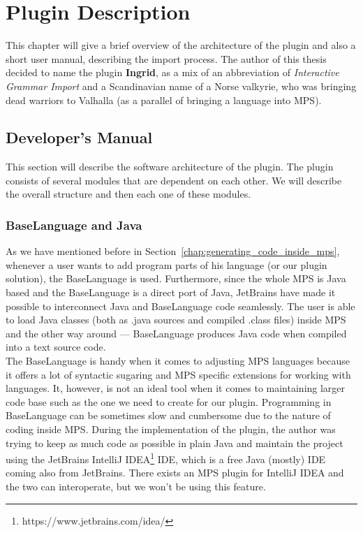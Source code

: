 \chapter{Plugin Description}

This chapter will give a brief overview of the architecture of the plugin and also a short user manual, describing the import process.
The author of this thesis decided to name the plugin \textbf{Ingrid}, as a mix of an abbreviation of \textit{Interactive Grammar Import} and a Scandinavian name of a Norse valkyrie, who was bringing dead warriors to Valhalla (as a parallel of bringing a language into MPS).

\section{Developer's Manual}

This section will describe the software architecture of the plugin.
The plugin consists of several modules that are dependent on each other.
We will describe the overall structure and then each one of these modules.

\subsection{BaseLanguage and Java}

As we have mentioned before in Section~\ref{chap:generating_code_inside_mps}, whenever a user wants to add program parts of his language (or our plugin solution), the BaseLanguage is used.
Furthermore, since the whole MPS is Java based and the BaseLanguage is a direct port of Java, JetBrains have made it possible to interconnect Java and BaseLanguage code seamlessly.
The user is able to load Java classes (both as .java sources and compiled .class files) inside MPS and the other way around --- BaseLanguage produces Java code when compiled into a text source code.
\\

The BaseLanguage is handy when it comes to adjusting MPS languages because it offers a lot of syntactic sugaring and MPS specific extensions for working with languages.
It, however, is not an ideal tool when it comes to maintaining larger code base such as the one we need to create for our plugin.
Programming in BaseLanguage can be sometimes slow and cumbersome due to the nature of coding inside MPS.
During the implementation of the plugin, the author was trying to keep as much code as possible in plain Java and maintain the project using the JetBrains IntelliJ IDEA\footnote{https://www.jetbrains.com/idea/} IDE, which is a free Java (mostly) IDE coming also from JetBrains.
There exists an MPS plugin for IntelliJ IDEA and the two can interoperate, but we won't be using this feature.
\\


